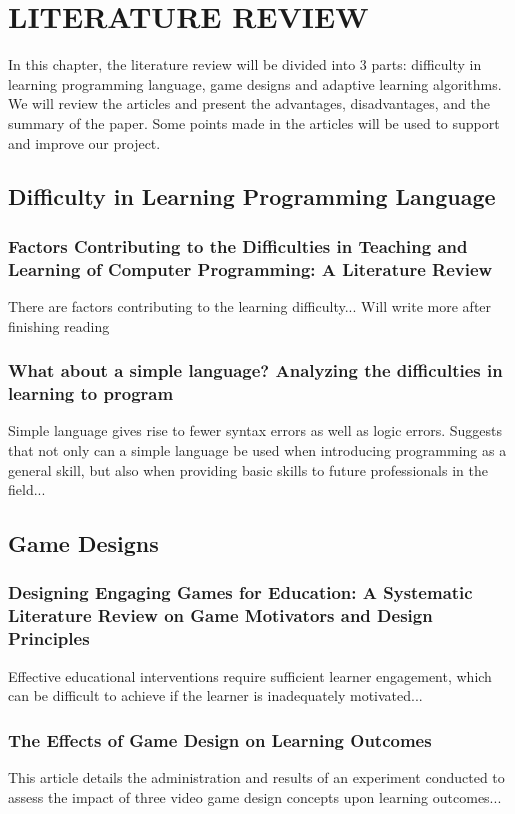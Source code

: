 \chapter{LITERATURE REVIEW}

In this chapter, the literature review will be divided into 3 parts: difficulty in learning programming language, game designs and adaptive learning algorithms. We will review the articles and present the advantages, disadvantages, and the summary of the paper. Some points made in the articles will be used to support and improve our project.

\section{Difficulty in Learning Programming Language}
\subsection{Factors Contributing to the Difficulties in Teaching and Learning of Computer Programming: A Literature Review \cite{Factors}}
There are factors contributing to the learning difficulty...
Will write more after finishing reading
\subsection{What about a simple language? Analyzing the difficulties in learning to program \cite{Analyze}}
Simple language gives rise to fewer syntax errors as well as logic errors.
Suggests that not only can a simple language be used when introducing programming as a general skill, but also when providing basic skills to future professionals in the field...

\section{Game Designs}
\subsection{Designing Engaging Games for Education: A Systematic Literature Review on Game Motivators and Design Principles \cite{Design}}
Effective educational interventions require sufficient learner engagement, which can be difficult to achieve if the learner is inadequately motivated...
\subsection{The Effects of Game Design on Learning Outcomes \cite{Effect}}
This article details the administration and results of an experiment conducted to assess the impact of three video game design concepts upon learning outcomes...
